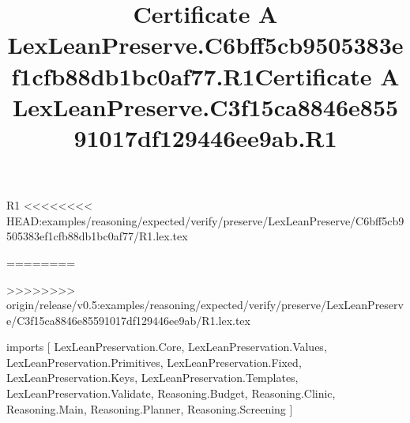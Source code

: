 \begin{lexlean}{R1}
<<<<<<<< HEAD:examples/reasoning/expected/verify/preserve/LexLeanPreserve/C6bff5cb9505383ef1cfb88db1bc0af77/R1.lex.tex
\title{Certificate A LexLeanPreserve.C6bff5cb9505383ef1cfb88db1bc0af77.R1}
========
\title{Certificate A LexLeanPreserve.C3f15ca8846e85591017df129446ee9ab.R1}
>>>>>>>> origin/release/v0.5:examples/reasoning/expected/verify/preserve/LexLeanPreserve/C3f15ca8846e85591017df129446ee9ab/R1.lex.tex
\begin{coremodule}
imports [
  LexLeanPreservation.Core,
  LexLeanPreservation.Values,
  LexLeanPreservation.Primitives,
  LexLeanPreservation.Fixed,
  LexLeanPreservation.Keys,
  LexLeanPreservation.Templates,
  LexLeanPreservation.Validate,
  Reasoning.Budget,
  Reasoning.Clinic,
  Reasoning.Main,
  Reasoning.Planner,
  Reasoning.Screening
]


\end{coremodule}
\end{lexlean}
